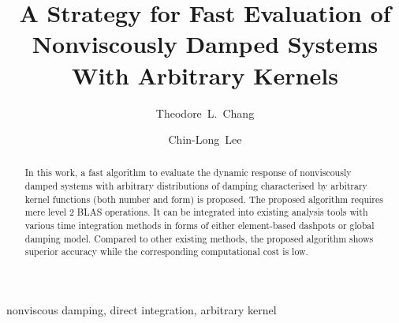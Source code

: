 \documentclass[3p,11pt,fleqn,review,sort&compress]{elsarticle}
\begin{document}
\linenumbers
\begin{abstract}
\begin{linenumbers}
In this work, a fast algorithm to evaluate the dynamic response of nonviscously damped systems with arbitrary distributions of damping characterised by arbitrary kernel functions (both number and form) is proposed. The proposed algorithm requires mere level 2 BLAS operations. It can be integrated into existing analysis tools with various time integration methods in forms of either element-based dashpots or global damping model. Compared to other existing methods, the proposed algorithm shows superior accuracy while the corresponding computational cost is low.
\end{linenumbers}
\end{abstract}
\begin{keyword}
nonviscous damping\sep
direct integration\sep
arbitrary kernel
\end{keyword}
\begin{frontmatter}
\title{A Strategy for Fast Evaluation of Nonviscously Damped Systems With Arbitrary Kernels}
\author[add1]{Theodore~L.~Chang}
\author[add2]{Chin-Long~Lee}
\address[add1]{IRIS Adlershof, Humboldt-Universität zu Berlin, Berlin, Germany, 12489.}
\address[add2]{Department of Civil and Natural Resources Engineering, University of Canterbury, Christchurch, New Zealand, 8041.}
\end{frontmatter}






\end{document}
